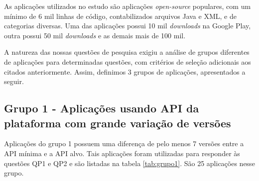 As aplicações utilizados no estudo são aplicações \textit{open-source} populares,
com um mínimo de 6 mil linhas de código, contabilizados arquivos Java e XML, e de
categorias diversas. Uma das aplicações possui 10 mil \textit{downloads} na Google
Play, outra possui 50 mil \textit{downloads} e as demais mais de 100 mil.

A natureza das nossas questões de pesquisa exigiu a análise de grupos diferentes
de aplicações para determinadas questões, com critérios de seleção adicionais aos
citados anteriormente. Assim, definimos 3 grupos de aplicações, apresentados a seguir.

\subsection{Grupo 1 - Aplicações usando API da plataforma com grande variação de versões}
Aplicações do grupo 1 possuem uma diferença de pelo menos 7 versões entre a API mínima e
a API alvo. Tais aplicações foram utilizadas para responder às questões QP1 e QP2 e são
listadas na tabela
\ref{tab:grupo1}. São 25 aplicações nesse grupo.

